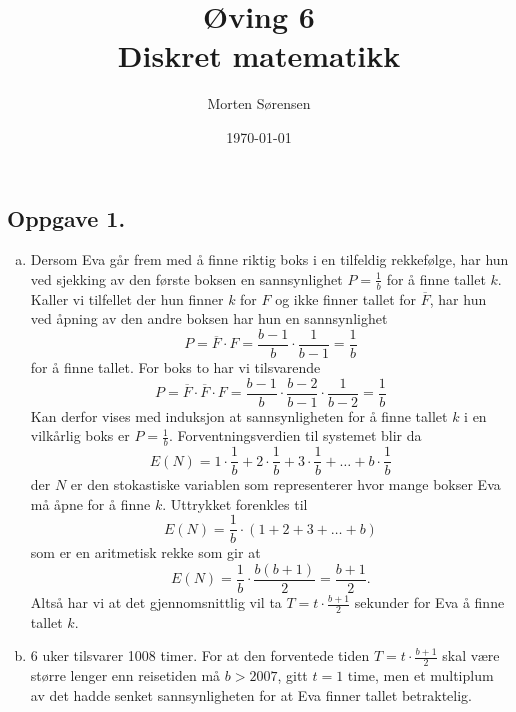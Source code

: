 \documentclass{article}
\title{\huge{Øving 6\\ Diskret matematikk}}
\author{Morten Sørensen}
\date{\today}
\begin{document}
\maketitle

\subsection*{Oppgave 1.}
\begin{enumerate}[(a)]
    \item {
        Dersom Eva går frem med å finne riktig boks i en tilfeldig rekkefølge, har hun ved 
        sjekking av den første boksen en sannsynlighet $P = \frac{1}{b}$ for å finne tallet $k$.
        Kaller vi tilfellet der hun finner $k$ for $F$ og ikke finner tallet for $\overline{F}$, har hun
        ved åpning av den andre boksen har hun en sannsynlighet 
        $$P = \overline{F} \cdot F = \frac{b-1}{b} \cdot \frac{1}{b-1} = \frac{1}{b}$$
        for å finne tallet. For boks to har vi tilsvarende
        $$P = \overline{F} \cdot \overline{F} \cdot F = \frac{b-1}{b} \cdot \frac{b-2}{b-1} \cdot \frac{1}{b-2} = \frac{1}{b}$$
        Kan derfor vises med induksjon at sannsynligheten for å finne tallet $k$ i en vilkårlig boks 
        er $P = \frac{1}{b}$. Forventningsverdien til systemet blir da 
        $$E(N) = 1 \cdot \frac{1}{b} + 2 \cdot \frac{1}{b} + 3 \cdot \frac{1}{b} + \dots + b \cdot \frac{1}{b}$$
        der $N$ er den stokastiske variablen som representerer hvor mange bokser Eva må åpne for å finne $k$.
        Uttrykket forenkles til 
        $$E(N) = \frac{1}{b} \cdot (1 + 2 + 3 + \dots + b)$$
        som er en aritmetisk rekke som gir at 
        $$E(N) = \frac{1}{b} \cdot \frac{b(b+1)}{2} = \frac{b+1}{2} \text{.}$$
        Altså har vi at det gjennomsnittlig vil ta $T = t \cdot \frac{b+1}{2}$ sekunder for 
        Eva å finne tallet $k$.
    }
    \item {
        6 uker tilsvarer 1008 timer. For at den forventede tiden $T = t \cdot \frac{b+1}{2}$ skal være større 
        lenger enn reisetiden må $b > 2007$, gitt $t = 1 \text{ time}$, men et multiplum av det hadde senket 
        sannsynligheten for at Eva finner tallet betraktelig.
    }
\end{enumerate}
\end{document}
